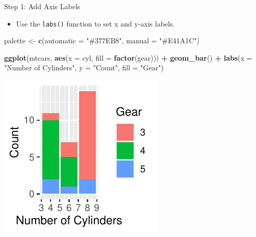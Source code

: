 \documentclass[
  ignorenonframetext,
]{beamer}
\newenvironment{Shaded}{\begin{snugshade}}{\end{snugshade}}
\newcommand{\AttributeTok}[1]{\textcolor[rgb]{0.13,0.29,0.53}{#1}}
\newcommand{\FunctionTok}[1]{\textcolor[rgb]{0.13,0.29,0.53}{\textbf{#1}}}
\newcommand{\NormalTok}[1]{#1}
\newcommand{\OtherTok}[1]{\textcolor[rgb]{0.56,0.35,0.01}{#1}}
\newcommand{\SpecialCharTok}[1]{\textcolor[rgb]{0.81,0.36,0.00}{\textbf{#1}}}
\newcommand{\StringTok}[1]{\textcolor[rgb]{0.31,0.60,0.02}{#1}}
\providecommand{\tightlist}{%
  \setlength{\itemsep}{0pt}\setlength{\parskip}{0pt}}
\begin{document}
\begin{frame}[fragile]{Step 1: Add Axis Labels}
\label{step-1-add-axis-labels}
\begin{itemize}
\tightlist
\item
  Use the \texttt{labs()} function to set x and y-axis labels.
\end{itemize}


\begin{Shaded}
\begin{Highlighting}[]
\NormalTok{palette }\OtherTok{\textless{}{-}} \FunctionTok{c}\NormalTok{(}\AttributeTok{automatic =} \StringTok{"\#377EB8"}\NormalTok{, }\AttributeTok{manual =} \StringTok{"\#E41A1C"}\NormalTok{)}

\FunctionTok{ggplot}\NormalTok{(mtcars, }\FunctionTok{aes}\NormalTok{(}\AttributeTok{x =}\NormalTok{ cyl, }\AttributeTok{fill =} \FunctionTok{factor}\NormalTok{(gear))) }\SpecialCharTok{+} \FunctionTok{geom\_bar}\NormalTok{() }\SpecialCharTok{+}
    \FunctionTok{labs}\NormalTok{(}\AttributeTok{x =} \StringTok{"Number of Cylinders"}\NormalTok{, }\AttributeTok{y =} \StringTok{"Count"}\NormalTok{, }\AttributeTok{fill =} \StringTok{"Gear"}\NormalTok{)}
\end{Highlighting}
\end{Shaded}

\begin{center}\includegraphics[width=0.5\linewidth]{Figs/unnamed-chunk-28-1} \end{center}
\end{frame}
\end{document}
